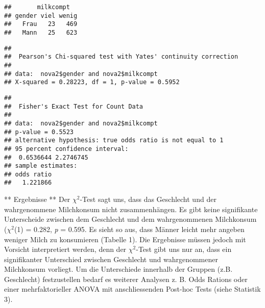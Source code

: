 \documentclass[]{article}
\newenvironment{Shaded}{\begin{snugshade}}{\end{snugshade}}
\newcommand{\CommentTok}[1]{\textcolor[rgb]{0.56,0.35,0.01}{\textit{#1}}}
\newcommand{\KeywordTok}[1]{\textcolor[rgb]{0.13,0.29,0.53}{\textbf{#1}}}
\newcommand{\NormalTok}[1]{#1}
\newcommand{\OperatorTok}[1]{\textcolor[rgb]{0.81,0.36,0.00}{\textbf{#1}}}
\newcommand{\StringTok}[1]{\textcolor[rgb]{0.31,0.60,0.02}{#1}}
\begin{document}
\begin{verbatim}
##       milkcompt
## gender viel wenig
##   Frau   23   469
##   Mann   25   623
\end{verbatim}

\begin{Shaded}
\end{Shaded}

\begin{verbatim}
## 
##  Pearson's Chi-squared test with Yates' continuity correction
## 
## data:  nova2$gender and nova2$milkcompt
## X-squared = 0.28223, df = 1, p-value = 0.5952
\end{verbatim}

\begin{Shaded}
\end{Shaded}

\begin{verbatim}
## 
##  Fisher's Exact Test for Count Data
## 
## data:  nova2$gender and nova2$milkcompt
## p-value = 0.5523
## alternative hypothesis: true odds ratio is not equal to 1
## 95 percent confidence interval:
##  0.6536644 2.2746745
## sample estimates:
## odds ratio 
##   1.221866
\end{verbatim}

** Ergebnisse ** Der \(\chi^2\)-Test sagt uns, dass das Geschlecht und
der wahrgenommene Milchkonsum nicht zusammenhängen. Es gibt keine
signifikante Unterscheide zwischen dem Geschlecht und dem wahrgenommenen
Milchkonsum (\(\chi^2\)(1) = 0.282, \emph{p} = 0.595. Es sieht so aus,
dass Männer leicht mehr angeben weniger Milch zu konsumieren (Tabelle
1). Die Ergebnisse müssen jedoch mit Vorsicht interpretiert werden, denn
der \(\chi^2\)-Test gibt uns nur an, dass ein signifikanter Unterschied
zwischen Geschlecht und wahrgenommener Milchkonsum vorliegt. Um die
Unterschiede innerhalb der Gruppen (z.B. Geschlecht) festzustellen
bedarf es weiterer Analysen z. B. Odds Rations oder einer
mehrfaktorieller ANOVA mit anschliessenden Post-hoc Tests (siehe
Statistik 3).
\end{document}
